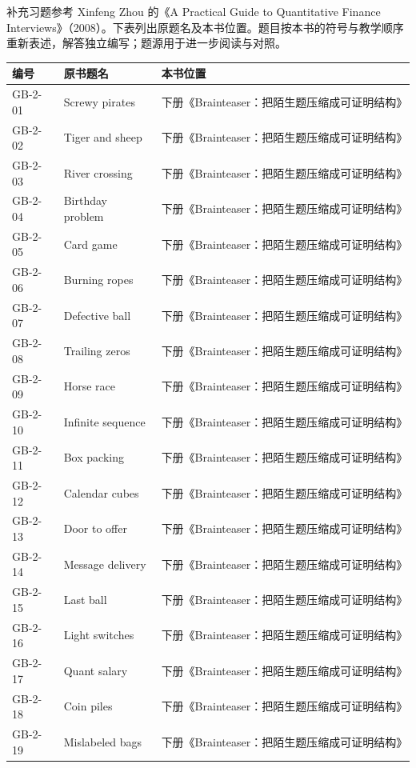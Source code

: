 补充习题参考 Xinfeng Zhou 的《A Practical Guide to Quantitative Finance Interviews》（2008）。下表列出原题名及本书位置。题目按本书的符号与教学顺序重新表述，解答独立编写；题源用于进一步阅读与对照。
\begin{longtable}{p{}p{}p{}}
编号 & 原书题名 & 本书位置 \\ \hline
GB-2-01 & Screwy pirates & 下册《Brainteaser：把陌生题压缩成可证明结构》 \\
GB-2-02 & Tiger and sheep & 下册《Brainteaser：把陌生题压缩成可证明结构》 \\
GB-2-03 & River crossing & 下册《Brainteaser：把陌生题压缩成可证明结构》 \\
GB-2-04 & Birthday problem & 下册《Brainteaser：把陌生题压缩成可证明结构》 \\
GB-2-05 & Card game & 下册《Brainteaser：把陌生题压缩成可证明结构》 \\
GB-2-06 & Burning ropes & 下册《Brainteaser：把陌生题压缩成可证明结构》 \\
GB-2-07 & Defective ball & 下册《Brainteaser：把陌生题压缩成可证明结构》 \\
GB-2-08 & Trailing zeros & 下册《Brainteaser：把陌生题压缩成可证明结构》 \\
GB-2-09 & Horse race & 下册《Brainteaser：把陌生题压缩成可证明结构》 \\
GB-2-10 & Infinite sequence & 下册《Brainteaser：把陌生题压缩成可证明结构》 \\
GB-2-11 & Box packing & 下册《Brainteaser：把陌生题压缩成可证明结构》 \\
GB-2-12 & Calendar cubes & 下册《Brainteaser：把陌生题压缩成可证明结构》 \\
GB-2-13 & Door to offer & 下册《Brainteaser：把陌生题压缩成可证明结构》 \\
GB-2-14 & Message delivery & 下册《Brainteaser：把陌生题压缩成可证明结构》 \\
GB-2-15 & Last ball & 下册《Brainteaser：把陌生题压缩成可证明结构》 \\
GB-2-16 & Light switches & 下册《Brainteaser：把陌生题压缩成可证明结构》 \\
GB-2-17 & Quant salary & 下册《Brainteaser：把陌生题压缩成可证明结构》 \\
GB-2-18 & Coin piles & 下册《Brainteaser：把陌生题压缩成可证明结构》 \\
GB-2-19 & Mislabeled bags & 下册《Brainteaser：把陌生题压缩成可证明结构》 \\

\end{longtable}
